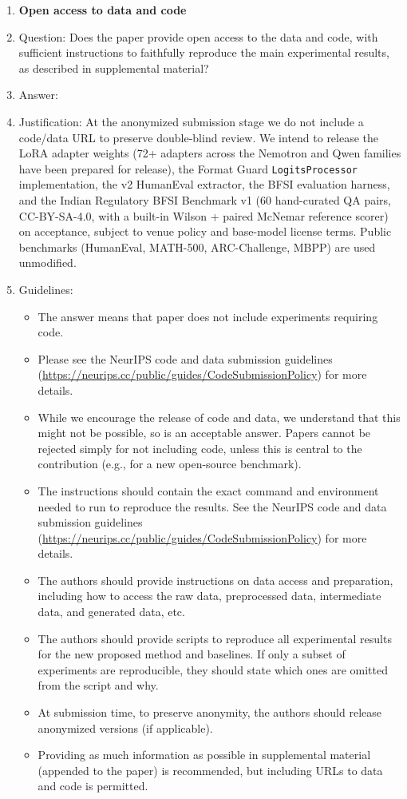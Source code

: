 \begin{enumerate}
\item {\bf Open access to data and code}
    \item[] Question: Does the paper provide open access to the data and code, with sufficient instructions to faithfully reproduce the main experimental results, as described in supplemental material?
    \item[] Answer: \answerNo{}
    \item[] Justification: At the anonymized submission stage we do not include a code/data URL to preserve double-blind review. We intend to release the LoRA adapter weights (72+ adapters across the Nemotron and Qwen families have been prepared for release), the Format Guard \texttt{LogitsProcessor} implementation, the v2 HumanEval extractor, the BFSI evaluation harness, and the Indian Regulatory BFSI Benchmark v1 (60 hand-curated QA pairs, CC-BY-SA-4.0, with a built-in Wilson + paired McNemar reference scorer) on acceptance, subject to venue policy and base-model license terms. Public benchmarks (HumanEval, MATH-500, ARC-Challenge, MBPP) are used unmodified.
    \item[] Guidelines:
    \begin{itemize}
        \item The answer \answerNA{} means that paper does not include experiments requiring code.
        \item Please see the NeurIPS code and data submission guidelines (\url{https://neurips.cc/public/guides/CodeSubmissionPolicy}) for more details.
        \item While we encourage the release of code and data, we understand that this might not be possible, so \answerNo{} is an acceptable answer. Papers cannot be rejected simply for not including code, unless this is central to the contribution (e.g., for a new open-source benchmark).
        \item The instructions should contain the exact command and environment needed to run to reproduce the results. See the NeurIPS code and data submission guidelines (\url{https://neurips.cc/public/guides/CodeSubmissionPolicy}) for more details.
        \item The authors should provide instructions on data access and preparation, including how to access the raw data, preprocessed data, intermediate data, and generated data, etc.
        \item The authors should provide scripts to reproduce all experimental results for the new proposed method and baselines. If only a subset of experiments are reproducible, they should state which ones are omitted from the script and why.
        \item At submission time, to preserve anonymity, the authors should release anonymized versions (if applicable).
        \item Providing as much information as possible in supplemental material (appended to the paper) is recommended, but including URLs to data and code is permitted.
    \end{itemize}



\end{enumerate}

